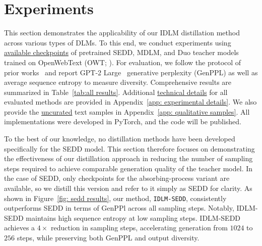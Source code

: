 \vspace{-2mm}
\section{Experiments}
\label{sec:exps}
\vspace{-2mm}
  This section demonstrates the applicability of our IDLM distillation method across various types of DLMs. To this end, we conduct experiments using \underline{available checkpoints} of pretrained SEDD, MDLM, and Duo teacher models trained on OpenWebText (OWT; \citealp{gokaslan2019openwebtext}). For evaluation, we follow the protocol of prior works~\citep{dieleman2022continuous, lou2024discrete, deschenaux2024beyond, sahoo2024simple, sahoo2025the} and report GPT-2 Large~\citep{radford2019language} generative perplexity (GenPPL) as well as average sequence entropy to measure diversity. Comprehensive results are summarized in Table~\ref{tab:all results}. Additional \underline{technical details} for all evaluated methods are provided in Appendix~\ref{app: experimental details}. We also provide the \underline{uncurated} text samples in Appendix~\ref{app: qualitative samples}. All implementations were developed in PyTorch, and the code will be published.

  To the best of our knowledge, no distillation methods have been developed specifically for the SEDD model. This section therefore focuses on demonstrating the effectiveness of our distillation approach in reducing the number of sampling steps required to achieve comparable generation quality of the teacher model. In the case of SEDD, only checkpoints for the absorbing-process variant are available, so we distill this version and refer to it simply as SEDD for clarity.
  As shown in Figure~\ref{fig: sedd results}, our method, \texttt{IDLM-SEDD}, consistently outperforms SEDD in terms of GenPPl across all sampling steps. Notably, IDLM-SEDD maintains high sequence entropy at low sampling steps. IDLM-SEDD achieves a $4\times$ reduction in sampling steps, accelerating generation from $1024$ to $256$ steps, while preserving both GenPPL and output diversity.
    
